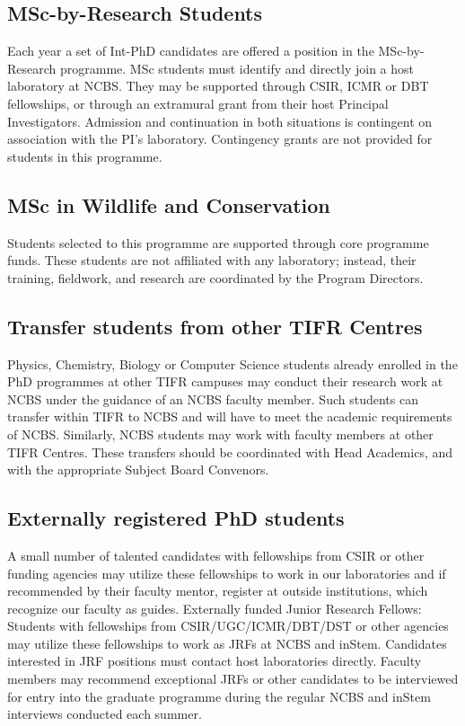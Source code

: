 \documentclass[a4paper,10pt]{article}
\begin{document}
\subsection{MSc-by-Research Students}
Each year a set of Int-PhD candidates are
offered a position in the MSc-by-Research programme. MSc students must identify
and directly join a host laboratory at NCBS. They may be supported through CSIR,
ICMR or DBT fellowships, or through an extramural grant from their host
Principal Investigators. Admission and continuation in both situations is
contingent on association with the PI’s laboratory.  Contingency grants are not
provided for students in this programme.

\subsection{MSc in Wildlife and Conservation}
Students selected to this programme are supported through core programme funds.
These students are not affiliated with any laboratory; instead, their training,
fieldwork, and research are coordinated by the Program Directors. 

\subsection{Transfer students from other TIFR Centres}
Physics, Chemistry, Biology or Computer
Science students already enrolled in the PhD programmes at other TIFR campuses
may conduct their research work at NCBS under the guidance of an NCBS faculty
member. Such students can transfer within TIFR to NCBS and will have to meet the
academic requirements of NCBS. Similarly, NCBS students may work with faculty
members at other TIFR Centres.  These transfers should be coordinated with Head
Academics, and with the appropriate Subject Board Convenors. 

\subsection{Externally registered PhD students}
A small number of talented candidates with fellowships
from CSIR or other funding agencies may utilize these fellowships to work in our
laboratories and if recommended by their faculty mentor, register at outside
institutions, which recognize our faculty as guides.  Externally funded Junior
Research Fellows: Students with fellowships from CSIR/UGC/ICMR/DBT/DST or other
agencies may utilize these fellowships to work as JRFs at NCBS and inStem.
Candidates interested in JRF positions must contact host laboratories directly.
Faculty members may recommend exceptional JRFs or other candidates to be
interviewed for entry into the graduate programme during the regular NCBS and
inStem interviews conducted each summer. 
\end{document}
